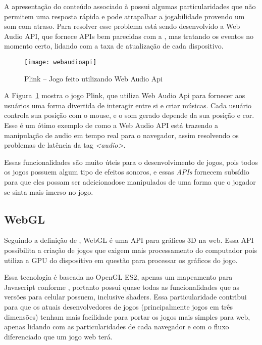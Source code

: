 A apresentação do conteúdo associado à \tagaudio  possui algumas particularidades que não permitem uma
resposta rápida e pode atrapalhar a jogabilidade provendo um som com
atraso. Para resolver esse problema está sendo desenvolvido a
Web Audio API, que fornece APIs bem parecidas com a \tagaudio, mas
tratando os eventos no momento certo, lidando com a taxa de
atualização de cada dispositivo.

\begin{figure}[H]
  \centering
	\texttt{[image: webaudioapi]}
  \caption{Plink {--} Jogo feito utilizando Web Audio Api}
  \label{img:webaudioapi}
\end{figure}

A Figura~\ref{img:webaudioapi} mostra o jogo Plink, que utiliza Web
Audio Api para fornecer aos usuários uma forma divertida de interagir
entre si e criar músicas. Cada usuário controla sua posição com o
mouse, e o som gerado depende da sua posição e cor. Esse é um ótimo
exemplo de como a Web Audio API está trazendo a manipulação de audio
em tempo real para o navegador, assim resolvendo os problemas de
latência da tag \textit{<audio>}.

Essas funcionalidades são muito úteis para o desenvolvimento de jogos, pois
todos os jogos possuem algum tipo de efeitos sonoros, e essas
\textit{APIs} fornecem subsídio para que eles possam ser adcicionadose
manipulados de uma forma que o jogador se sinta mais imerso no jogo.

\subsection{WebGL}

Seguindo a definição de , WebGL é uma API para gráficos 3D na web. Essa
API possibilita a criação de jogos que exigem mais processamento do
computador pois utiliza a GPU do dispositivo em questão para processar
os gráficos do jogo.

Essa tecnologia é baseada no OpenGL ES2, apenas um mapeamento para
Javascript conforme , portanto possui
quase todas as funcionalidades que as versões para celular possuem,
inclusive shaders. Essa particularidade contribui
para que os atuais desenvolvedores de jogos (principalmente jogos em
três dimensões) tenham mais facilidade para portar os jogos mais
simples para web, apenas lidando com as particularidades de cada
navegador e com o fluxo diferenciado que um jogo web terá.

